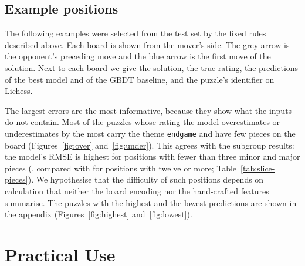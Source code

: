 \documentclass[11pt]{article}
\begin{document}
\begin{table}[htbp]\centering\small
{}
\caption{Agreement with the GBDT baseline on the test set: the correlation
between the two models' predictions, and the share of puzzles on which the
model is closer to the true rating than the baseline.}
\label{tab:beside}
\end{table}

\subsection{Example positions}
\label{sec:positions}

The following examples were selected from the test set by the fixed rules
described above. Each board is shown from the mover's side. The grey arrow is
the opponent's preceding move and the blue arrow is the first move of the
solution. Next to each board we give the solution, the true rating, the
predictions of the best model and of the GBDT baseline, and the puzzle's
identifier on Lichess.

The largest errors are the most informative, because they show what the
inputs do not contain. Most of the puzzles whose rating the model
overestimates or underestimates by the most carry the theme
\texttt{endgame} and have few pieces on the board (Figures~\ref{fig:over}
and~\ref{fig:under}). This agrees with the subgroup results: the model's
RMSE is highest for positions with fewer than three minor and major pieces
(, compared with
 for positions with twelve or more;
Table~\ref{tab:slice-pieces}). We hypothesise that the difficulty of such
positions depends on calculation that neither the board encoding nor the
hand-crafted features summarise. The puzzles with the highest and the lowest
predictions are shown in the appendix (Figures~\ref{fig:highest}
and~\ref{fig:lowest}).



\fi

\section{Practical Use}
\label{sec:use}
\end{document}
